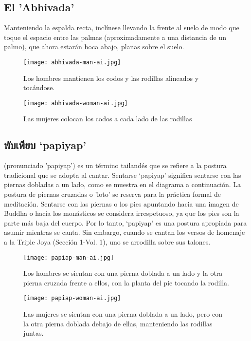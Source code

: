 \subsection{El 'Abhivada'}
Manteniendo la espalda recta, inclínese llevando la frente al suelo de modo que toque el espacio entre las palmas (aproximadamente a una distancia de un palmo), que ahora estarán boca abajo, planas sobre el suelo.
\begin{figure}[h]
	\centering
	\begin{minipage}{0.40\textwidth}
		\centering
		\texttt{[image: abhivada-man-ai.jpg]}
		\caption{Los hombres mantienen los codos y las rodillas alineados y tocándose.}
	\end{minipage}
	\hfill
	\begin{minipage}{0.40\textwidth}
		\centering
		\texttt{[image: abhivada-woman-ai.jpg]}
		\caption{Las mujeres colocan los codos a cada lado de las rodillas}
	\end{minipage}
\end{figure}

\subsection{\thaiFont พับเพียบ ‘papiyap'}

 \normalfont(pronunciado 'papiyap') es un término tailandés que se refiere a la postura tradicional que se adopta al cantar. Sentarse ‘papiyap' significa sentarse con las piernas dobladas a un lado, como se muestra en el diagrama a continuación. La postura de piernas cruzadas o 'loto' se reserva para la práctica formal de meditación. Sentarse con las piernas o los pies apuntando hacia una imagen de Buddha o hacia los monásticos se considera irrespetuoso, ya que los pies son la parte más baja del cuerpo. Por lo tanto, ‘papiyap' es una postura apropiada para asumir mientras se canta. Sin embargo, cuando se cantan los versos de homenaje a la Triple Joya (Sección 1-Vol. 1), uno se arrodilla sobre sus talones. 
\enlargethispage{3\baselineskip}
\begin{figure}[h]
	\centering
	
	\begin{minipage}{0.40\textwidth}
		\centering
		\texttt{[image: papiap-man-ai.jpg]}
		\caption{Los hombres se sientan con una pierna doblada a un lado y la otra pierna cruzada frente a ellos, con la planta del pie tocando la rodilla.}
	\end{minipage}
	\hfill
	\begin{minipage}{0.40\textwidth}
		\centering
		\texttt{[image: papiap-woman-ai.jpg]}
		\caption{Las mujeres se sientan con una pierna doblada a un lado, pero con la otra pierna doblada debajo de ellas, manteniendo las rodillas juntas.}
	\end{minipage}
	
\end{figure}

